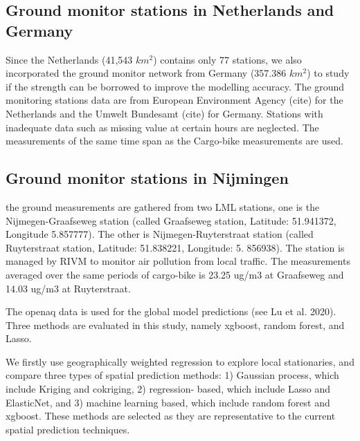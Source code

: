 \documentclass{article}
\begin{document}
\subsection{Ground monitor stations in Netherlands and Germany}

Since the Netherlands (41,543 $km^2$) contains only 77 stations, we also incorporated the ground monitor network from Germany (357.386 $km^2$) to study if the strength can be borrowed to improve the modelling accuracy. The ground monitoring stations data are from European Environment Agency (cite) for the Netherlands and the Umwelt Bundesamt (cite) for Germany. Stations with inadequate data such as  missing value at certain hours are neglected. The measurements of the same time span as the Cargo-bike measurements are used.  


\subsection{Ground monitor stations in Nijmingen}
the ground measurements are gathered from two LML stations, one is the Nijmegen-Graafseweg station (called Graafseweg station, Latitude: 51.941372, Longitude 5.857777). The other is Nijmegen-Ruyterstraat station (called Ruyterstraat station, Latitude: 51.838221, Longitude: 5. 856938). The station is managed by RIVM to monitor air pollution from local traffic. The measurements averaged over the same periods of cargo-bike is 23.25 ug/m3 at Graafseweg and 14.03 ug/m3 at Ruyterstraat.
\par
The openaq data is used for the global model predictions (see Lu et al. 2020). Three methods are evaluated in this study, namely xgboost, random forest, and Lasso. 



\par
\par
We firstly use geographically weighted regression to explore local stationaries, and compare three types of spatial prediction methods: 1) Gaussian process, which include Kriging and cokriging, 2) regression- based, which include Lasso and ElasticNet, and 3) machine learning based, which include random forest and xgboost. These methods are selected as they are representative to the current spatial prediction techniques.  
\end{document}
